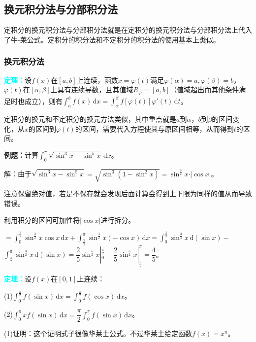 \documentclass[UTF8, 12pt]{ctexart}
\begin{document}
\subsection{换元积分法与分部积分法}

定积分的换元积分法与分部积分法就是在定积分的换元积分法与分部积分法上代入了牛-莱公式。定积分的积分法和不定积分的积分法的使用基本上类似。

\subsubsection{换元积分法}

\textcolor{aqua}{\textbf{定理：}}设$f(x)$在$[a,b]$上连续，函数$x=\varphi(t)$满足$\varphi(\alpha)=a,\varphi(\beta)=b$，$\varphi(t)$在$[\alpha,\beta]$上具有连续导数，且其值域$R_\varphi=[a,b]$（值域超出而其他条件满足时也成立），则有$\int_a^bf(x)\,\textrm{d}x=\int_\alpha^\beta f[\varphi(t)]\varphi'(t)\,\textrm{d}t$。

定积分的换元和不定积分的换元方法类似，其中重点就是$a$到$\alpha$，$b$到$\beta$的区间变化，从$x$的区间到$\varphi(t)$的区间，需要代入方程使其与原区间相等，从而得到$t$的区间。

\textbf{例题：}计算$\int_0^\pi\sqrt{\sin^3x-\sin^5x}\,\textrm{d}x$。

解：由于$\sqrt{\sin^3x-\sin^5x}=\sqrt{\sin^3(1-\sin^2x)}=\sin^\frac{3}{2}x\cdot\vert\cos x\vert$。

注意保留绝对值，若是不保存就会发现后面计算会得到上下限为同样的值从而导致错误。

利用积分的区间可加性将$\vert\cos x\vert$进行拆分。

$=\int_0^\frac{\pi}{2}\sin^\frac{3}{2}x\cos x\,\textrm{d}x+\int_\frac{\pi}{2}^\pi\sin^\frac{3}{2}x(-\cos x)\,\textrm{d}x=\int_0^\frac{\pi}{2}\sin^\frac{3}{2}x\,\textrm{d}(\sin x)-$\\$\int_\frac{\pi}{2}^\pi\sin^\frac{3}{2}x\,\textrm{d}(\sin x)=\dfrac{2}{5}\sin^\frac{5}{2}x|_0^\frac{\pi}{2}-\dfrac{2}{5}\sin^\frac{5}{2}x|_\frac{\pi}{2}^\pi=\dfrac{4}{5}$。

\textcolor{aqua}{\textbf{定理：}}设$f(x)$在$[0,1]$上连续：

(1)$\int_0^\frac{\pi}{2}f(\sin x)\,\textrm{d}x=\int_0^\frac{\pi}{2}f(\cos x)\,\textrm{d}x$。

(2)$\int_0^\pi xf(\sin x)\,\textrm{d}x=\dfrac{\pi}{2}\int_0^\pi f(\sin x)\,\textrm{d}x$。

(1)证明：这个证明式子很像华莱士公式。不过华莱士给定函数$f(x)=x^n$。
\end{document}
